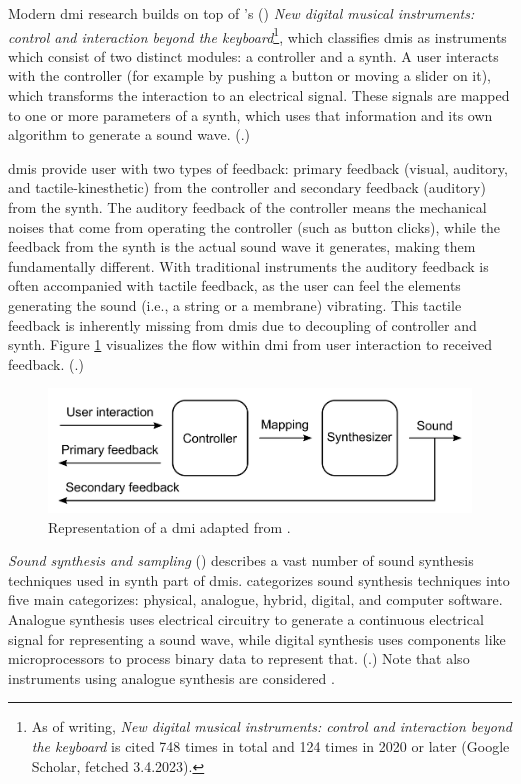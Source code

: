 Modern \gls{dmi} research builds on top of \citeauthor{miranda-wanderley2006}'s (\citeyear{miranda-wanderley2006}) \textit{New digital musical instruments: control and interaction beyond the keyboard}\footnote{As of writing, \textit{New digital musical instruments: control and interaction beyond the keyboard} is cited 748 times in total and 124 times in 2020 or later (Google Scholar, fetched 3.4.2023).}, which classifies \glspl{dmi} as instruments which consist of two distinct modules: a \gls{controller} and a \gls{synth}. A user interacts with the \gls{controller} (for example by pushing a button or moving a slider on it), which transforms the interaction to an electrical signal. These signals are mapped to one or more parameters of a \gls{synth}, which uses that information and its own algorithm to generate a sound wave. (\cite{miranda-wanderley2006}.)

\glspl{dmi} provide user with two types of feedback: primary feedback (visual, auditory, and tactile-kinesthetic) from the \gls{controller} and secondary feedback (auditory) from the \gls{synth}. The auditory feedback of the \gls{controller} means the mechanical noises that come from operating the \gls{controller} (such as button clicks), while the feedback from the \gls{synth} is the actual sound wave it generates, making them fundamentally different. With traditional instruments the auditory feedback is often accompanied with tactile feedback, as the user can feel the elements generating the sound (i.e., a string or a membrane) vibrating. This tactile feedback is inherently missing from \glspl{dmi} due to decoupling of \gls{controller} and \gls{synth}. Figure \ref{dmi} visualizes the flow within \gls{dmi} from user interaction to received feedback. (\cite{miranda-wanderley2006}.)

\begin{figure}[h]
	\centering
	\includegraphics[width=0.8\linewidth]{figures/dmi.png}
	\caption{Representation of a \gls{dmi} adapted from \textcite{miranda-wanderley2006}.}
	\label{dmi}
\end{figure}

\textit{Sound synthesis and sampling} (\cite{russ2009}) describes a vast number of sound synthesis techniques used in \gls{synth} part of \glspl{dmi}. \textcite{russ2009} categorizes sound synthesis techniques into five main categorizes: physical, analogue, hybrid, digital, and computer software. Analogue synthesis uses electrical circuitry to generate a continuous electrical signal for representing a sound wave, while digital synthesis uses components like microprocessors to process binary data to represent that. (\cite{russ2009}.) Note that also instruments using analogue synthesis are considered .

